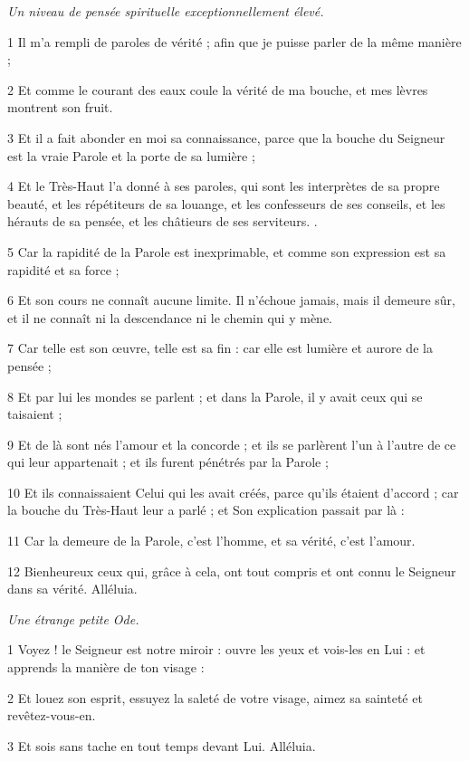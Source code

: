 
\par \textit{Un niveau de pensée spirituelle exceptionnellement élevé.}

\par 1 Il m'a rempli de paroles de vérité ; afin que je puisse parler de la même manière ;
\par 2 Et comme le courant des eaux coule la vérité de ma bouche, et mes lèvres montrent son fruit.
\par 3 Et il a fait abonder en moi sa connaissance, parce que la bouche du Seigneur est la vraie Parole et la porte de sa lumière ;
\par 4 Et le Très-Haut l'a donné à ses paroles, qui sont les interprètes de sa propre beauté, et les répétiteurs de sa louange, et les confesseurs de ses conseils, et les hérauts de sa pensée, et les châtieurs de ses serviteurs. .
\par 5 Car la rapidité de la Parole est inexprimable, et comme son expression est sa rapidité et sa force ;
\par 6 Et son cours ne connaît aucune limite. Il n’échoue jamais, mais il demeure sûr, et il ne connaît ni la descendance ni le chemin qui y mène.
\par 7 Car telle est son œuvre, telle est sa fin : car elle est lumière et aurore de la pensée ;
\par 8 Et par lui les mondes se parlent ; et dans la Parole, il y avait ceux qui se taisaient ;
\par 9 Et de là sont nés l'amour et la concorde ; et ils se parlèrent l'un à l'autre de ce qui leur appartenait ; et ils furent pénétrés par la Parole ;
\par 10 Et ils connaissaient Celui qui les avait créés, parce qu'ils étaient d'accord ; car la bouche du Très-Haut leur a parlé ; et Son explication passait par là :
\par 11 Car la demeure de la Parole, c'est l'homme, et sa vérité, c'est l'amour.
\par 12 Bienheureux ceux qui, grâce à cela, ont tout compris et ont connu le Seigneur dans sa vérité. Alléluia.


\par \textit{Une étrange petite Ode.}

\par 1 Voyez ! le Seigneur est notre miroir : ouvre les yeux et vois-les en Lui : et apprends la manière de ton visage :
\par 2 Et louez son esprit, essuyez la saleté de votre visage, aimez sa sainteté et revêtez-vous-en.
\par 3 Et sois sans tache en tout temps devant Lui. Alléluia.


